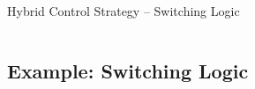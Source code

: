\documentclass[notheorems, aspectratio=169, presentation]{beamer}
\begin{document}
\begin{frame}[t]{Hybrid Control Strategy -- Switching Logic}
\begin{minipage}[t][\minipageheight][t]{\linewidth}
\begin{columns}
\begin{column}[T]{0.50\linewidth}
    \end{column}
    \begin{column}[T]{0.5\textwidth}
    \end{column}
  \end{columns}
  \end{minipage}
\end{frame}

\subsection{Example: Switching Logic}
\end{document}
